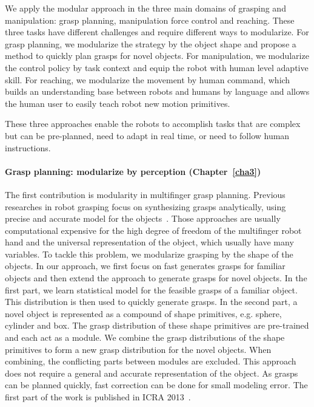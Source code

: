 We apply the modular approach in the three main domains of grasping and manipulation: grasp planning, manipulation force control and reaching. These three tasks have different challenges and require different ways to modularize. For grasp planning, we modularize the strategy by the object shape and propose a method to quickly plan grasps for novel objects. For manipulation, we modularize the control policy by task context and equip the robot with human level adaptive skill. For reaching, we modularize the movement by human command, which builds an understanding base between robots and humans by language and allows the human user to easily teach robot new motion primitives.

These three approaches enable the robots to accomplish tasks that are complex but can be pre-planned, need to adapt in real time, or need to follow human instructions.



\paragraph{Grasp planning: modularize by perception (Chapter~\ref{cha3})}
The first contribution is modularity in multifinger grasp planning. Previous researches in robot grasping focus on synthesizing grasps analytically, using precise and accurate model for the objects~\citep{sahbani2011overview}. Those approaches are usually computational expensive for the high degree of freedom of the multifinger robot hand and the universal representation of the object, which usually have many variables. To tackle this problem, we modularize grasping by the shape of the objects. In our approach, we first focus on fast generates grasps for familiar objects and then extend the approach to generate grasps for novel objects. In the first part, we learn statistical model for the feasible grasps of a familiar object. This distribution is then used to quickly generate grasps. In the second part, a novel object is represented as a compound of shape primitives, e.g. sphere, cylinder and box. The grasp distribution of these shape primitives are pre-trained and each act as a module. We combine the grasp distributions of the shape primitives to form a new grasp distribution for the novel objects. When combining, the conflicting parts between modules are excluded.
This approach does not require a general and accurate representation of the object. As grasps can be planned quickly, fast correction can be done for small modeling error. The first part of the work is published in ICRA 2013~\citep{bidan2013grasp}.

